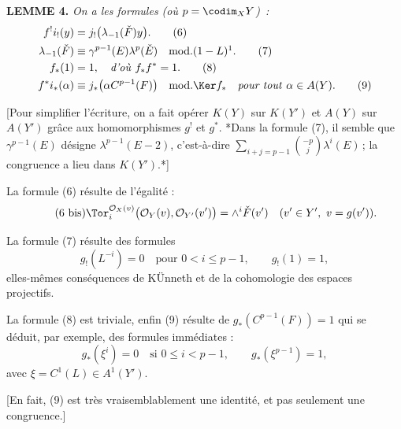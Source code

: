 \textbf{LEMME 4.} \emph{On a les formules (où \(p=\codim_XY\))~:}
\begin{align}
  f^!i_!(y)&=j_!\bigl(\lambda_{-1}(\check F)y\bigr). \tag{6}\\
  \lambda_{-1}(\check F)&\equiv \gamma^{p-1}(E)\lambda^p(\check E)
    \quad\text{mod.}(1-L)\footnotemark. \tag{7}\\
  f_*(1)&=1,\quad\text{\emph{d'où} }f_*f^*=1. \tag{8}\\
  f^*i_*(\alpha)&\equiv j_*\bigl(\alpha C^{p-1}(F)\bigr)
    \quad\text{mod.}\Ker f_*\quad\text{\emph{pour tout} }\alpha\in A(Y). \tag{9}
\end{align}

[Pour simplifier l'écriture, on a fait opérer \(K(Y)\) sur \(K(Y')\) et \(A(Y)\) sur \(A(Y')\) grâce aux homomorphismes \(g^!\) et \(g^*\). {*}Dans la formule (7), il semble que \(\gamma^{p-1}(E)\) désigne \(\lambda^{p-1}(E-2)\), c'est-à-dire \(\sum_{i+j=p-1}\binom{-p}{j}\lambda^i(E)\)\,; la congruence a lieu dans \(K(Y')\).{*}]

La formule (6) résulte de l'égalité :
\begin{equation}\tag{6 bis}
  \Tor_i^{\mathcal O_X(v)}\bigl(\mathcal O_Y(v),\mathcal O_{Y'}(v')\bigr)
  =
  \wedge^i\check F(v')
  \quad (v'\in Y',\ v=g(v')).
\end{equation}

La formule (7) résulte des formules
\begin{equation}\tag{10}
  g_!(L^{-i})=0\quad\text{pour }0<i\leq p-1,\qquad g_!(1)=1,
\end{equation}
elles-mêmes conséquences de KÜnneth et de la cohomologie des espaces projectifs.

La formule (8) est triviale, enfin (9) résulte de \(g_*(C^{p-1}(F))=1\) qui se déduit, par exemple, des formules immédiates :
\begin{equation}\tag{10 bis}
  g_*(\xi^i)=0\quad\text{si }0\leq i<p-1,\qquad
  g_*(\xi^{p-1})=1,
\end{equation}
avec \(\xi=C^1(L)\in A^1(Y')\).

[En fait, (9) est très vraisemblablement une identité, et pas seulement une congruence.]

